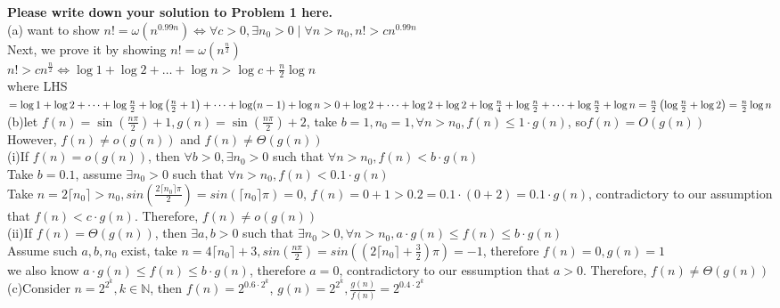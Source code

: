 \documentclass[11pt,twoside]{article}
\newcommand\N{\mbox{$\mathbb N$}}
\providecommand\ceil[1]{\lceil#1\rceil}
\newenvironment{solution}{{\par\noindent\it Solution.}}{}
\begin{document}
\begin{solution}
\textbf{Please write down your solution to Problem 1 here.}
\vspace{0.45cm}\\
(a) want to show $n!=\omega(n^{0.99n})
\iff\forall c>0, \exists n_0>0\mid \forall n>n_0, n!>cn^{0.99n}$\\
Next, we prove it by showing $n!=\omega(n^\frac{n}{2})$\\
$n!>cn^{\frac{n}{2}}\iff\log 1+\log 2+\dots+\log n>\log c + \frac{n}{2}\log n$\\
where LHS
$=\log 1+\log 2+\dots+\log \frac{n}{2}+\log\left(\frac{n}{2}+1\right)+\dots+\log(n-1)+\log n\\
>0+\log 2+\dots+\log 2+\log 2+\log\frac{n}{4}+\log\frac{n}{2}+\dots+\log\frac{n}{2}+\log{n}\\
=\frac{n}{2}\left(\log\frac{n}{2}+\log 2\right)=\frac{n}{2}\log n$
\vspace{0.45cm}\\
(b)let $f(n)=\sin(\frac{n\pi}{2})+1, g(n)=\sin(\frac{n\pi}{2})+2$, take $b=1,
n_0=1, \forall n>n_0, f(n)\leq1\cdot g(n)$, so$f(n)=O(g(n))$\\
However, $f(n)\neq o(g(n))$ and $f(n)\neq \Theta(g(n))$
\vspace{0.3cm}\\
(i)If $f(n) = o(g(n))$, then $\forall b>0, \exists n_0>0$ such that $\forall n>n_0, f(n)<b\cdot g(n)$\\
Take $b=0.1$, assume $\exists n_0>0$ such that $\forall n>n_0, f(n)<0.1\cdot g(n)$\\
Take $n=2\ceil{n_0}>n_0, sin(\frac{2\ceil{n_0}\pi}{2})=sin(\ceil{n_0}\pi)=0$, $f(n)=0+1>0.2=0.1\cdot (0+2)=0.1\cdot g(n)$, 
contradictory to our assumption that $f(n)<c\cdot g(n)$. Therefore, $f(n)\neq o(g(n))$
\vspace{0.3cm}\\
(ii)If $f(n)=\Theta(g(n))$, then $\exists a,b>0$ such that $\exists n_0>0,\forall n>n_0,
a\cdot g(n)\leq f(n)\leq b\cdot g(n)$\\
Assume such $a,b,n_0$ exist, take $n=4\ceil{n_0}+3, sin(\frac{n\pi}{2})=sin\left((2\ceil{n_0}+\frac{3}{2})\pi\right)=-1$, therefore $f(n)=0, g(n)=1$\\
we also know $a\cdot g(n)\leq f(n)\leq b\cdot g(n)$, therefore $a=0$, 
contradictory to our essumption that $a>0$. Therefore, $f(n)\neq \Theta(g(n))$
\vspace{0.45cm}\\
(c)Consider $n=2^{2^k}, k\in \N$, then $f(n)=2^{0.6\cdot 2^k}$, $g(n)=2^{2^k}, \frac{g(n)}{f(n)}=2^{0.4\cdot 2^k}$\\

\end{solution}
\end{document}
